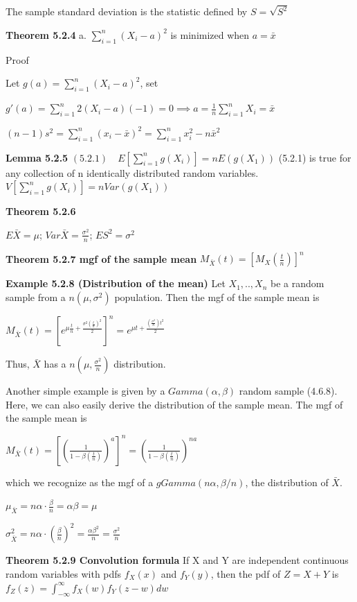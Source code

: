\documentclass[10pt,twocolumn,portrait]{article}
\begin{document}
The sample standard deviation is the statistic defined by
\(S=\sqrt{S^2}\)

\textbf{Theorem 5.2.4} a. \(\sum_{i=1}^n(X_i-a)^2\) is minimized when
\(a=\bar x\)

Proof

Let \(g(a)=\sum_{i=1}^n(X_i-a)^2\), set

\(g'(a)=\sum_{i=1}^n2(X_i-a)(-1)=0\implies a=\frac1n\sum_{i=1}^nX_i=\bar x\)

\((n-1)s^2=\sum_{i=1}^n(x_i-\bar x)^2=\sum_{i=1}^nx_i^2-n\bar x^2\)

\textbf{Lemma 5.2.5} \((5.2.1)\quad E[\sum_{i=1}^ng(X_i)]=nE(g(X_1))\)
(5.2.1) is true for any collection of n identically distributed random
variables. \(V[\sum_{i=1}^ng(X_i)]=nVar(g(X_1))\)

\textbf{Theorem 5.2.6}

\(E\bar X=\mu\); \(Var\bar X=\frac{\sigma^2}n\); \(ES^2=\sigma^2\)

\textbf{Theorem 5.2.7 mgf of the sample mean}
\(M_{\bar X}(t)=[M_X(\frac{t}n)]^n\)

\textbf{Example 5.2.8 (Distribution of the mean)} Let \(X_1,..,X_n\) be
a random sample from a \(n(\mu,\sigma^2)\) population. Then the mgf of
the sample mean is

\(M_{\bar X}(t)=\left[e^{\mu\frac{t}n+\frac{\sigma^2{(\frac{t}n)}^2}2}\right]^n=e^{\mu t+\frac{(\frac{\sigma^2}{n})t^2}2}\)

Thus, \(\bar X\) has a \(n(\mu,\frac{\sigma^2}n)\) distribution.

Another simple example is given by a \(Gamma(\alpha,\beta)\) random
sample (4.6.8). Here, we can also easily derive the distribution of the
sample mean. The mgf of the sample mean is

\(M_{\bar X}(t)=\left[\left(\frac1{1-\beta(\frac{t}n)}\right)^{a}\right]^n=\left(\frac1{1-\beta(\frac{t}n)}\right)^{na}\)

which we recognize as the mgf of a \(gGamma(n\alpha,\beta/n)\), the
distribution of \(\bar X\).

\(\mu_{\bar X}=n\alpha\cdot\frac\beta n=\alpha\beta=\mu\)

\(\sigma^2_{\bar X}=n\alpha\cdot(\frac\beta n)^2=\frac{\alpha\beta^2}n=\frac{\sigma^2}n\)

\textbf{Theorem 5.2.9 Convolution formula} If X and Y are independent
continuous random variables with pdfs \(f_X(x)\) and \(f_Y(y)\), then
the pdf of \(Z=X+Y\) is
\(f_Z(z) =\int_{-\infty}^{\infty}f_X(w)f_Y(z-w)dw\)
\end{document}
